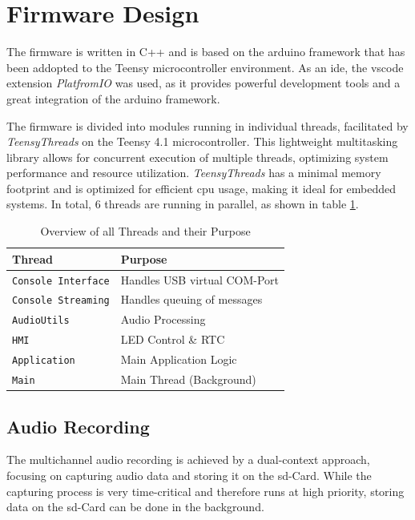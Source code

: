 \newpage
\section{Firmware Design}
The firmware is written in C++ and is based on the \gls{arduino} framework that has been addopted to the Teensy microcontroller environment.
As an \acrshort{ide}, the \acrshort{vscode} extension \textit{PlatfromIO} was used, as it provides powerful development tools and a great integration of the \gls{arduino} framework.

The firmware is divided into modules running in individual threads, facilitated by \textit{TeensyThreads} on the Teensy 4.1 microcontroller.
This lightweight multitasking library allows for concurrent execution of multiple threads, optimizing system performance and resource utilization.
\textit{TeensyThreads} has a minimal memory footprint and is optimized for efficient \acrshort{cpu} usage, making it ideal for embedded systems.
In total, 6 threads are running in parallel, as shown in table \ref{tab:acquisition_system_threads}.
\begin{table}[h]
	\centering
	\begin{tabular}{|l|l|}
		\hline
		Thread                     & Purpose                      \\ \hline
		\texttt{Console Interface} & Handles USB virtual COM-Port \\ \hline
		\texttt{Console Streaming} & Handles queuing of messages  \\ \hline
		\texttt{AudioUtils}        & Audio Processing             \\ \hline
		\texttt{HMI}               & LED Control \& RTC           \\ \hline
		\texttt{Application}       & Main Application Logic       \\ \hline
		\texttt{Main}              & Main Thread (Background)     \\ \hline
	\end{tabular}
	\caption{Overview of all Threads and their Purpose}
	\label{tab:acquisition_system_threads}
\end{table}

\subsection{Audio Recording}
The multichannel audio recording is achieved by a dual-context approach, focusing on capturing audio data and storing it on the \acrshort{sd}-Card.
While the capturing process is very time-critical and therefore runs at high priority, storing data on the \acrshort{sd}-Card can be done in the background.

